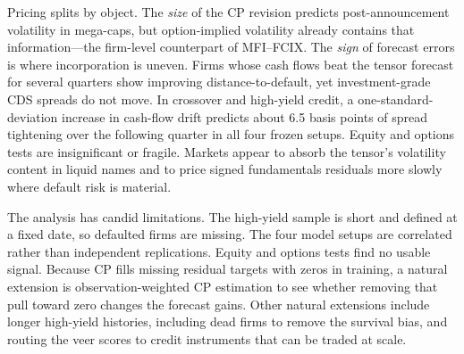 \documentclass[pdflatex,sn-mathphys-num]{sn-jnl}%
\theoremstyle{thmstyleone}%
\theoremstyle{thmstyletwo}%
\theoremstyle{thmstylethree}%
\begin{document}
Pricing splits by object. The \emph{size} of the CP revision predicts post-announcement volatility in mega-caps, but option-implied volatility already contains that information---the firm-level counterpart of MFI--FCIX. The \emph{sign} of forecast errors is where incorporation is uneven. Firms whose cash flows beat the tensor forecast for several quarters show improving distance-to-default, yet investment-grade CDS spreads do not move. In crossover and high-yield credit, a one-standard-deviation increase in cash-flow drift predicts about 6.5 basis points of spread tightening over the following quarter in all four frozen setups. Equity and options tests are insignificant or fragile. Markets appear to absorb the tensor's volatility content in liquid names and to price signed fundamentals residuals more slowly where default risk is material.

The analysis has candid limitations. The high-yield sample is short and defined at a fixed date, so defaulted firms are missing. The four model setups are correlated rather than independent replications. Equity and options tests find no usable signal. Because CP fills missing residual targets with zeros in training, a natural extension is observation-weighted CP estimation to see whether removing that pull toward zero changes the forecast gains. Other natural extensions include longer high-yield histories, including dead firms to remove the survival bias, and routing the veer scores to credit instruments that can be traded at scale.
\end{document}
